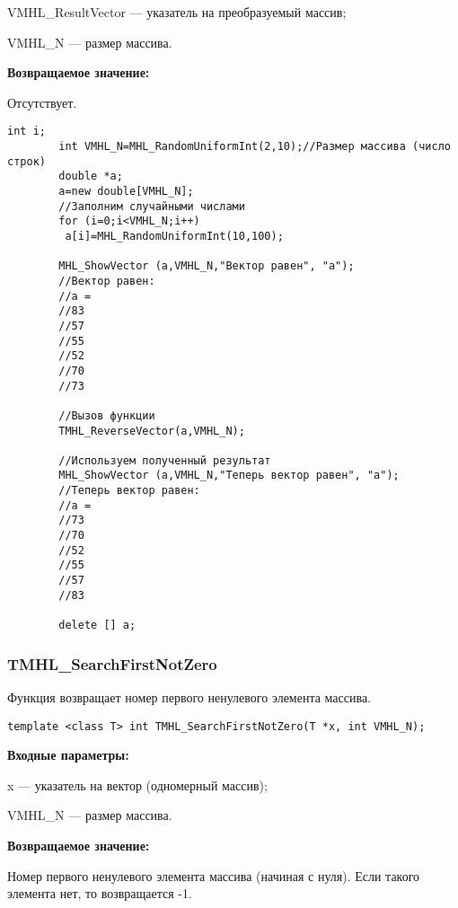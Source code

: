 \documentclass[a4paper,12pt]{article}
\begin{document}
VMHL\_ResultVector --- указатель на преобразуемый массив;
 
VMHL\_N --- размер массива.

\textbf{Возвращаемое значение:}

Отсутствует.


\begin{lstlisting}[label=code_use_TMHL_ReverseVector,caption=Пример использования]
        int i;
        int VMHL_N=MHL_RandomUniformInt(2,10);//Размер массива (число строк)
        double *a;
        a=new double[VMHL_N];
        //Заполним случайными числами
        for (i=0;i<VMHL_N;i++)
         a[i]=MHL_RandomUniformInt(10,100);

        MHL_ShowVector (a,VMHL_N,"Вектор равен", "a");
        //Вектор равен:
        //a =
        //83
        //57
        //55
        //52
        //70
        //73

        //Вызов функции
        TMHL_ReverseVector(a,VMHL_N);

        //Используем полученный результат
        MHL_ShowVector (a,VMHL_N,"Теперь вектор равен", "a");
        //Теперь вектор равен:
        //a =
        //73
        //70
        //52
        //55
        //57
        //83

        delete [] a;
\end{lstlisting}

\subsubsection{TMHL\_SearchFirstNotZero}\label{TMHL_SearchFirstNotZero}

Функция возвращает номер первого ненулевого элемента массива.


\begin{lstlisting}[label=code_syntax_TMHL_SearchFirstNotZero,caption=Синтаксис]
template <class T> int TMHL_SearchFirstNotZero(T *x, int VMHL_N);
\end{lstlisting}

\textbf{Входные параметры:}

 x --- указатель на вектор (одномерный массив);
 
 VMHL\_N --- размер массива.

\textbf{Возвращаемое значение:}

Номер первого ненулевого элемента массива (начиная с нуля). Если такого элемента нет, то возвращается -1.
\end{document}
